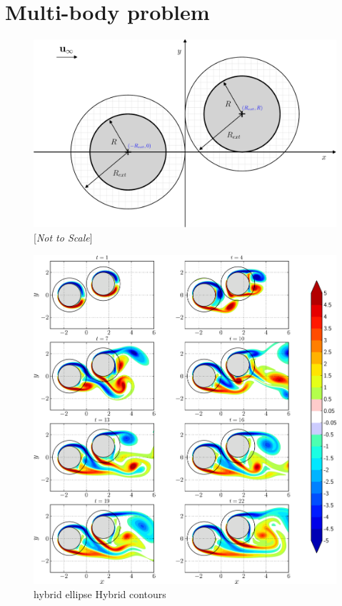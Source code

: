 	
\section{Multi-body problem}
\label{sec:vvhm-mb}
	\begin{figure}[!h]
	\showthe\columnwidth
	\centering
	\includegraphics[width=0.6\linewidth]{./figures/hybrid/multipleCylinder/hmisc_dd-crop.pdf}
	\caption{[\textit{Not to Scale}] }
	\label{fig:hmisc_dd-crop}
	\end{figure}

	\begin{figure}[!p]
	\showthe\columnwidth
	\centering
	\includegraphics[width=\linewidth]{./figures/hybrid/multipleCylinder/hybrid_multipleCylinder_contours_compressed-crop.png}
	\caption{hybrid ellipse Hybrid contours}
	\label{fig:hybrid_multipleCylinder_contours_compressed-crop}
	\end{figure}

